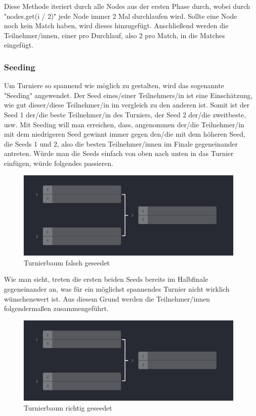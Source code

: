 Diese Methode iteriert durch alle Nodes aus der ersten Phase durch, wobei durch "nodes.get(i / 2)" jede Node immer 2 Mal durchlaufen wird. 
Sollte eine Node noch kein Match haben, wird dieses hinzugefügt. Anschließend werden die Teilnehmer/innen, einer pro Durchlauf, also 2 pro Match, 
in die Matches eingefügt. 

\subsubsection{Seeding}

Um Turniere so spannend wie möglich zu gestalten, wird das sogenannte "Seeding" angewendet. Der Seed eines/einer Teilnehmers/in ist eine Einschätzung, wie gut dieser/diese Teilnehmer/in im vergleich zu den anderen 
ist. Somit ist der Seed 1 der/die beste Teilnehmer/in des Turniers, der Seed 2 der/die zweitbeste, usw. Mit Seeding will man erreichen, dass, angenommen der/die Teilnehmer/in mit dem niedrigeren Seed gewinnt immer gegen den/die 
mit dem höheren Seed, die Seeds 1 und 2, also die besten Teilnehmer/innen im Finale gegeneinander antreten. Würde man die Seeds einfach von oben nach unten in das Turnier einfügen, würde folgendes passieren.

\begin{figure}[H]
    \includegraphics[scale=0.33]{pics/elimination_tree_seeded_wrong.png}
    \caption{Turnierbaum falsch geseedet\cite{implementation-elimination-1}}
\end{figure}

Wie man sieht, treten die ersten beiden Seeds bereits im Halbfinale gegeneinander an, was für ein möglichst spannendes Turnier nicht wirklich wünschenswert ist. Aus diesem Grund werden die Teilnehmer/innen folgendermaßen zusammengeführt.

\begin{figure}[H]
    \includegraphics[scale=0.515]{pics/elimination_tree_seeded.png}
    \caption{Turnierbaum richtig geseedet\cite{implementation-elimination-1}}
\end{figure}

